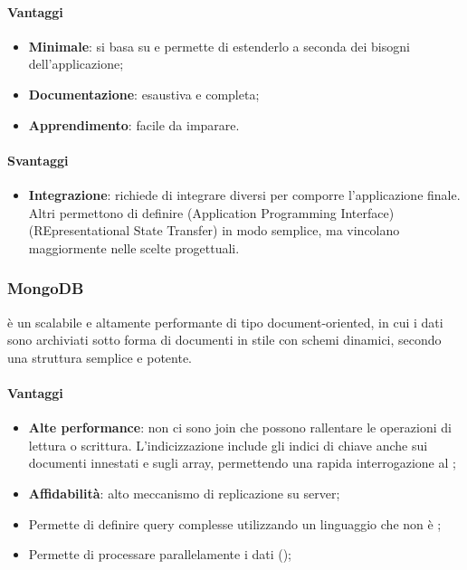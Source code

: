 \paragraph{Vantaggi}
\begin{itemize}
\item \textbf{Minimale}: si basa su  e permette di estenderlo a seconda dei bisogni
dell’applicazione;
\item\textbf{Documentazione}: esaustiva e completa;
\item\textbf{Apprendimento}: facile da imparare.
\end{itemize}

\paragraph{Svantaggi}
\begin{itemize}
\item \textbf{Integrazione}: richiede di integrare  diversi per comporre l’applicazione
finale. Altri  permettono di definire  (Application Programming
Interface)  (REpresentational State Transfer) in modo semplice, ma vincolano
maggiormente nelle scelte progettuali.
\end{itemize}


	\subsubsection{MongoDB}
\textbf{} è un    scalabile e altamente performante di tipo document-oriented, in cui i dati sono archiviati sotto forma di documenti in stile  con schemi dinamici, secondo una struttura semplice e potente. \\

\paragraph{Vantaggi}
 \begin{itemize}

\item \textbf{Alte performance}: non ci sono join che possono rallentare le operazioni di lettura o scrittura. L'indicizzazione include gli indici di chiave anche sui documenti innestati e sugli array, permettendo una rapida interrogazione al ;
\item \textbf{Affidabilità}: alto meccanismo di replicazione su server;
\item Permette di definire query complesse utilizzando un linguaggio che non è ;
\item Permette di processare parallelamente i dati ();
\end{itemize}

